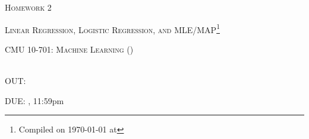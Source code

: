 \documentclass{article}
\begin{document}
\section*{}
\begin{center}
  \centerline{\textsc{\LARGE  Homework 2}}
  \vspace{0.5em}
  \centerline{\textsc{\large Linear Regression, Logistic Regression, and MLE/MAP}\footnote{Compiled on \today{} at \currenttime{}}}
  \vspace{1em}
  \textsc{\large CMU 10-701: Machine Learning (\currentsemester)} \\
  \vspace{0.5em}
  \currentpiazza \\
  \vspace{0.5em}
  \centerline{OUT: \hwTwoRelease}
  \vspace{0.5em}
  \centerline{DUE: \hwTwoDue, 11:59pm}
\end{center}
\end{document}
